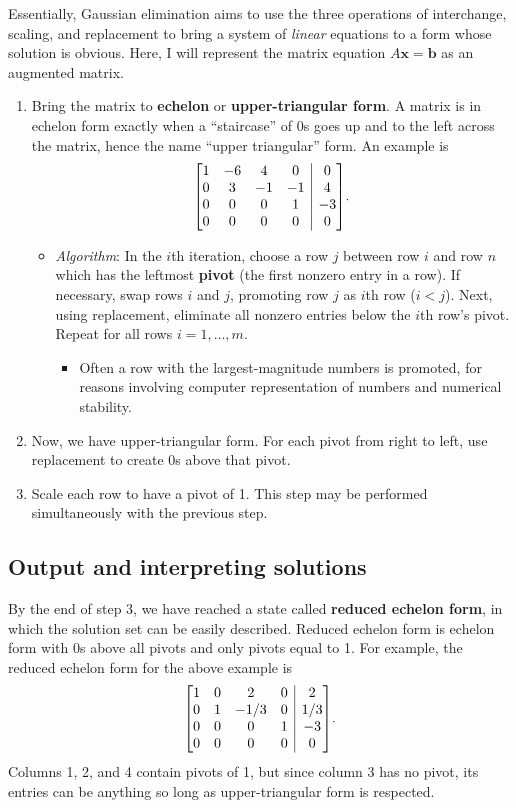 \documentclass[draft,12pt]{report}
\makeatletter
\newenvironment{amatrix}[1]{%
  \left[\begin{array}{@{}*{#1}{c}|c@{}}
}{%
  \end{array}\right]
}
\renewcommand{\vec}[1]{\mathbf{#1}}
\makeatother
\begin{document}
Essentially, Gaussian elimination aims to use the three operations of interchange, scaling, and replacement to bring a system of \emph{linear} equations to a form whose solution is obvious. Here, I will represent the matrix equation $A\vec{x} = \vec{b}$ as an augmented matrix.
\begin{enumerate}
    \item Bring the matrix to \textbf{echelon} or \textbf{upper-triangular form}. A matrix is in echelon form exactly when a ``staircase'' of 0s goes up and to the left across the matrix, hence the name ``upper triangular'' form. An example is
    \[ \begin{amatrix}{4}
        1 & -6 & 4 & 0 & 0 \\
        0 & 3 & -1 & -1 & 4 \\
        0 & 0 & 0 & 1 & -3 \\
        0 & 0 & 0 & 0 & 0
    \end{amatrix}. \]
    \begin{itemize}
        \item \emph{Algorithm}: In the $i$th iteration, choose a row $j$ between row $i$ and row $n$ which has the leftmost \textbf{pivot} (the first nonzero entry in a row). If necessary, swap rows $i$ and $j$, promoting row $j$ as $i$th row ($i < j$). Next, using replacement, eliminate all nonzero entries below the $i$th row's pivot. Repeat for all rows $i = 1, \ldots, m$.
        \begin{itemize}
            \item Often a row with the largest-magnitude numbers is promoted, for reasons involving computer representation of numbers and numerical stability.
        \end{itemize}
    \end{itemize}
    \item Now, we have upper-triangular form. For each pivot from right to left, use replacement to create 0s above that pivot.
    \item Scale each row to have a pivot of 1. This step may be performed simultaneously with the previous step.
\end{enumerate}

\subsection{Output and interpreting solutions}

By the end of step 3, we have reached a state called \textbf{reduced echelon form}, in which the solution set can be easily described. Reduced echelon form is echelon form with 0s above all pivots and only pivots equal to 1. For example, the reduced echelon form for the above example is
\[ \begin{amatrix}{4}
    1 & 0 & 2 & 0 & 2 \\
    0 & 1 & -1/3 & 0 & 1/3 \\
    0 & 0 & 0 & 1 & -3 \\
    0 & 0 & 0 & 0 & 0
\end{amatrix}. \]
Columns 1, 2, and 4 contain pivots of 1, but since column 3 has no pivot, its entries can be anything so long as upper-triangular form is respected.
\end{document}
